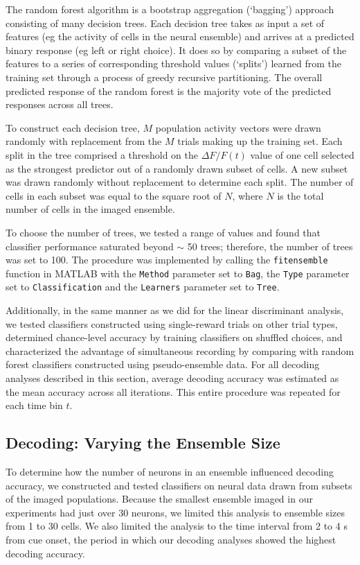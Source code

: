 The random forest algorithm is a bootstrap aggregation (‘bagging’) approach consisting of many decision trees. Each decision tree takes as input a set of features (eg the activity of cells in the neural ensemble) and arrives at a predicted binary response (eg left or right choice). It does so by comparing a subset of the features to a series of corresponding threshold values (‘splits’) learned from the training set through a process of greedy recursive partitioning. The overall predicted response of the random forest is the majority vote of the predicted responses across all trees. 

To construct each decision tree, $M$ population activity vectors were drawn randomly with replacement from the $M$ trials making up the training set. Each split in the tree comprised a threshold on the $\Delta F/F(t)$ value of one cell selected as the strongest predictor out of a randomly drawn subset of cells. A new subset was drawn randomly without replacement to determine each split. The number of cells in each subset was equal to the square root of $N$, where $N$ is the total number of cells in the imaged ensemble. 

To choose the number of trees, we tested a range of values and found that classifier performance saturated beyond $\sim$ 50 trees; therefore, the number of trees was set to 100. The procedure was implemented by calling the \texttt{fitensemble} function in MATLAB with the \texttt{Method} parameter set to \texttt{Bag}, the \texttt{Type} parameter set to \texttt{Classification} and the \texttt{Learners} parameter set to \texttt{Tree}. 

Additionally, in the same manner as we did for the linear discriminant analysis, we tested classifiers constructed using single-reward trials on other trial types, determined chance-level accuracy by training classifiers on shuffled choices, and characterized the advantage of simultaneous recording by comparing with random forest classifiers constructed using pseudo-ensemble data. For all decoding analyses described in this section, average decoding accuracy was estimated as the mean accuracy across all iterations. This entire procedure was repeated for each time bin $t$.

\subsection*{Decoding: Varying the Ensemble Size}
To determine how the number of neurons in an ensemble influenced decoding accuracy, we constructed and tested classifiers on neural data drawn from subsets of the imaged populations. Because the smallest ensemble imaged in our experiments had just over 30 neurons, we limited this analysis to ensemble sizes from 1 to 30 cells. We also limited the analysis to the time interval from 2 to 4 s from cue onset, the period in which our decoding analyses showed the highest decoding accuracy. 

